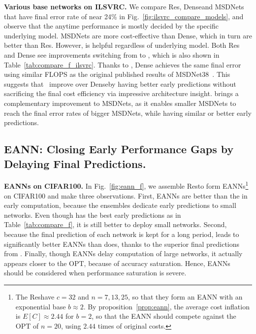 \textbf{Various base networks on ILSVRC.} We compare Res\anns, Dense\anns and MSDNets that have final error rate of near 24\% in Fig.~\ref{fig:ilsvrc_compare_models}, and observe that the anytime performance is mostly decided by the specific underlying model. MSDNets are more cost-effective than Dense\anns, which in turn are better than Res\anns. 
However, \adaloss is helpful regardless of underlying model. Both Res and Dense see improvements switching from \const to \adaloss, which is also shown in Table~\ref{tab:compare_f_ilsvrc}. 
Thanks to \adaloss, Dense achieves the same final error using similar FLOPS as the original published results of MSDNet38~\cite{msdense}. This suggests that~\cite{msdense} improve over Dense\anns by having better early predictions without sacrificing the final cost efficiency via impressive architecture insight. \adaloss brings a complementary improvement to MSDNets, as it enables smaller MSDNets to reach the final error rates of bigger MSDNets, while having similar or better early predictions. 




\subsection{EANN: Closing Early Performance Gaps by Delaying Final Predictions.}
\label{sec:eann_experiment}



\textbf{EANNs on CIFAR100.} In Fig.~\ref{fig:eann_f}, we assemble Res\anns to form EANNs\footnote{The Res\anns have $c=32$ and $n=7, 13, 25$, so that they form an EANN with an exponential base $b\approx 2$. 
By proposition~\ref{prop:eann}, the average cost inflation is $E[C]\approx 2.44$ for $b=2$, so that the EANN should 
compete against the OPT of $n=20$, using $2.44$ times of original costs.} on CIFAR100 and make three observations.
First, EANNs are better than the \ann in early computation, because the ensembles dedicate early predictions to small networks. Even though \const has the best early predictions as in Table~\ref{tab:compare_f}, it is still better to deploy small networks. 
Second, because the final prediction of each network is kept for a long period, \adaloss leads to significantly better EANNs than \const does, thanks to the superior final predictions from \adaloss. 
Finally, though EANNs delay computation of large networks, it actually appears closer to the OPT, because of accuracy saturation. Hence, EANNs should be considered when performance saturation is severe. 

